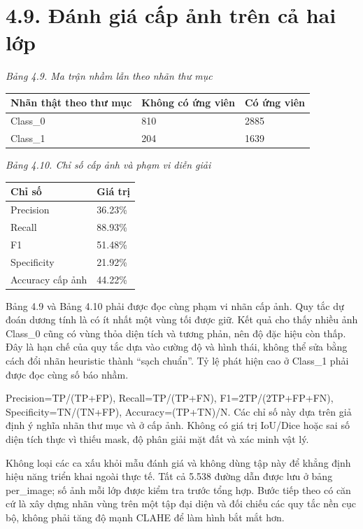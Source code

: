 \documentclass[13pt,a4paper]{extreport}
\begin{document}
\section*{4.9. Đánh giá cấp ảnh trên cả hai lớp}
\noindent\textit{Bảng 4.9. Ma trận nhầm lẫn theo nhãn thư mục}
\begin{longtable}{p{4.87cm}|p{4.87cm}|p{4.87cm}}
Nhãn thật theo thư mục & Không có ứng viên & Có ứng viên\\\hline
Class\_0 & 810 & 2885\\\hline
Class\_1 & 204 & 1639\\\hline
\end{longtable}
\noindent\textit{Bảng 4.10. Chỉ số cấp ảnh và phạm vi diễn giải}
\begin{longtable}{p{7.3cm}|p{7.3cm}}
Chỉ số & Giá trị\\\hline
Precision & 36.23\%\\\hline
Recall & 88.93\%\\\hline
F1 & 51.48\%\\\hline
Specificity & 21.92\%\\\hline
Accuracy cấp ảnh & 44.22\%\\\hline
\end{longtable}
Bảng 4.9 và Bảng 4.10 phải được đọc cùng phạm vi nhãn cấp ảnh. Quy tắc dự đoán dương tính là có ít nhất một vùng tối được giữ. Kết quả cho thấy nhiều ảnh Class\_0 cũng có vùng thỏa diện tích và tương phản, nên độ đặc hiệu còn thấp. Đây là hạn chế của quy tắc dựa vào cường độ và hình thái, không thể sửa bằng cách đổi nhãn heuristic thành “sạch chuẩn”. Tỷ lệ phát hiện cao ở Class\_1 phải được đọc cùng số báo nhầm.
\par
Precision=TP/(TP+FP), Recall=TP/(TP+FN), F1=2TP/(2TP+FP+FN), Specificity=TN/(TN+FP), Accuracy=(TP+TN)/N. Các chỉ số này dựa trên giả định ý nghĩa nhãn thư mục và ở cấp ảnh. Không có giá trị IoU/Dice hoặc sai số diện tích thực vì thiếu mask, độ phân giải mặt đất và xác minh vật lý.
\par
Không loại các ca xấu khỏi mẫu đánh giá và không dùng tập này để khẳng định hiệu năng triển khai ngoài thực tế. Tất cả 5.538 đường dẫn được lưu ở bảng per\_image; số ảnh mỗi lớp được kiểm tra trước tổng hợp. Bước tiếp theo có căn cứ là xây dựng nhãn vùng trên một tập đại diện và đối chiếu các quy tắc nền cục bộ, không phải tăng độ mạnh CLAHE để làm hình bắt mắt hơn.
\par
\clearpage
\end{document}
